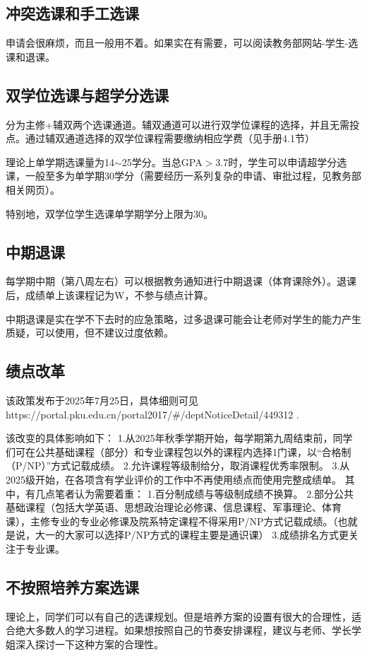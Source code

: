 \documentclass[11pt,oneside]{book}
\begin{document}
\subsection{冲突选课和手工选课}
申请会很麻烦，而且一般用不着。如果实在有需要，可以阅读教务部网站-学生-选课和退课。

\subsection{双学位选课与超学分选课}
分为主修+辅双两个选课通道。辅双通道可以进行双学位课程的选择，并且无需投点。通过辅双通道选择的双学位课程需要缴纳相应学费（见手册4.1节）

理论上单学期选课量为14$\sim$25学分。当总GPA$>$3.7时，学生可以申请超学分选课，一般至多为单学期30学分（需要经历一系列复杂的申请、审批过程，见教务部相关网页）。

特别地，双学位学生选课单学期学分上限为30。

\subsection{中期退课}
每学期中期（第八周左右）可以根据教务通知进行中期退课（体育课除外）。退课后，成绩单上该课程记为W，不参与绩点计算。

中期退课是实在学不下去时的应急策略，过多退课可能会让老师对学生的能力产生质疑，可以使用，但不建议过度依赖。

\subsection{绩点改革}
该政策发布于2025年7月25日，具体细则可见https://portal.pku.edu.cn/portal2017/#/deptNoticeDetail/449312 .

该改变的具体影响如下：
1.从2025年秋季学期开始，每学期第九周结束前，同学们可在公共基础课程（部分）和专业课程包以外的课程内选择1门课，以“合格制（P/NP）”方式记载成绩。
2.允许课程等级制给分，取消课程优秀率限制。
3.从2025级开始，在各项含有学业评价的工作中不再使用绩点而使用完整成绩单。
其中，有几点笔者认为需要着重：
1.百分制成绩与等级制成绩不换算。
2.部分公共基础课程（包括大学英语、思想政治理论必修课、信息课程、军事理论、体育课），主修专业的专业必修课及院系特定课程不得采用P/NP方式记载成绩。（也就是说，大一的大家可以选择P/NP方式的课程主要是通识课）
3.成绩排名方式更关注于专业课。

\subsection{不按照培养方案选课}
理论上，同学们可以有自己的选课规划。但是培养方案的设置有很大的合理性，适合绝大多数人的学习进程。如果想按照自己的节奏安排课程，建议与老师、学长学姐深入探讨一下这种方案的合理性。
\end{document}

